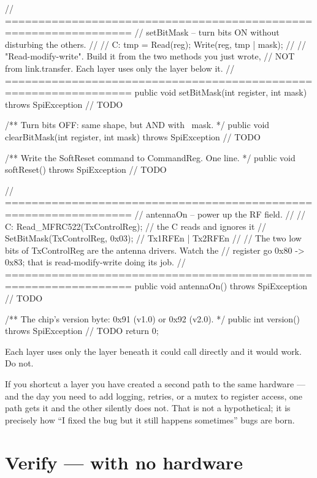 \begin{jcode}
{    // =================================================================
    // setBitMask -- turn bits ON without disturbing the others.
    //
    //   C:  tmp = Read(reg);  Write(reg, tmp | mask);
    //
    //   "Read-modify-write". Build it from the two methods you just wrote,
    //   NOT from link.transfer. Each layer uses only the layer below it.
    // =================================================================
    public void setBitMask(int register, int mask) throws SpiException {
        // TODO
    }

    /** Turn bits OFF: same shape, but AND with ~mask. */
    public void clearBitMask(int register, int mask) throws SpiException {
        // TODO
    }

    /** Write the SoftReset command to CommandReg. One line. */
    public void softReset() throws SpiException {
        // TODO
    }

    // =================================================================
    // antennaOn -- power up the RF field.
    //
    //   C:  Read_MFRC522(TxControlReg);      // the C reads and ignores it
    //       SetBitMask(TxControlReg, 0x03);  // Tx1RFEn | Tx2RFEn
    //
    //   The two low bits of TxControlReg are the antenna drivers. Watch the
    //   register go 0x80 -> 0x83; that is read-modify-write doing its job.
    // =================================================================
    public void antennaOn() throws SpiException {
        // TODO
    }

    /** The chip's version byte: 0x91 (v1.0) or 0x92 (v2.0). */
    public int version() throws SpiException {
        // TODO
        return 0;
    }
}
\end{jcode}

\begin{concept}{Each layer uses only the layer beneath it}
 could call  directly and it would work.
Do not.

If you shortcut a layer you have created a second path to the same hardware ---
and the day you need to add logging, retries, or a mutex to register access, one
path gets it and the other silently does not. That is not a hypothetical; it is
precisely how ``I fixed the bug but it still happens sometimes'' bugs are born.
\end{concept}

\section{Verify --- with no hardware}

